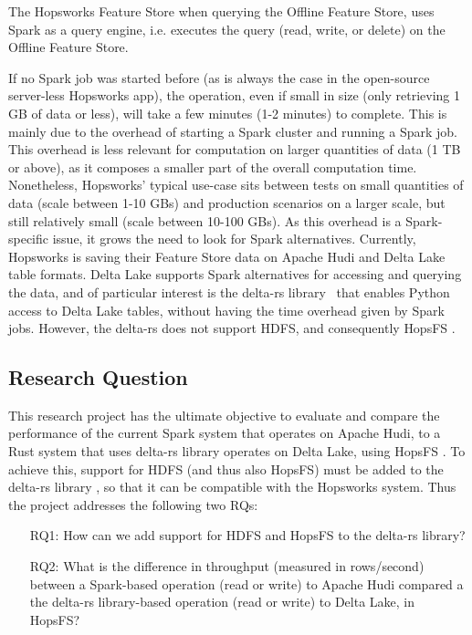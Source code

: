 The Hopsworks Feature Store \cite{HopsworksBatchRealtime2024} when querying the Offline Feature Store, uses Spark as a query engine, i.e. executes the query (read, write, or delete) on the Offline Feature Store.

If no Spark job was started before (as is always the case in the open-source server-less Hopsworks app), the operation, even if small in size (only retrieving 1 GB of data or less), will take a few minutes (1-2 minutes) to complete. This is mainly due to the overhead of starting a Spark cluster and running a Spark job.
This overhead is less relevant for computation on larger quantities of data (1 TB or above), as it composes a smaller part of the overall computation time.
Nonetheless, Hopsworks' typical use-case sits between tests on small quantities of data (scale between 1-10 GBs) and production scenarios on a larger scale, but still relatively small (scale between 10-100 GBs).
As this overhead is a Spark-specific issue, it grows the need to look for Spark alternatives. Currently, Hopsworks is saving their Feature Store data on Apache Hudi and Delta Lake table formats. Delta Lake supports Spark alternatives for accessing and querying the data, and of particular interest is the delta-rs library~\cite{DeltaioDeltars2024} that enables Python access to Delta Lake tables, without having the time overhead given by Spark jobs. 
However, the delta-rs \cite{DeltaioDeltars2024} does not support \gls{HDFS}, and consequently \gls{HopsFS} \cite{niaziHopsFSScalingHierarchical2017}.

\subsection{Research Question}
\label{sec:researchQuestion}
This research project has the ultimate objective to evaluate and compare the performance of the current Spark system that operates on Apache Hudi, to a Rust system that uses delta-rs library \cite{DeltaioDeltars2024} operates on Delta Lake, using \gls{HopsFS} \cite{niaziHopsFSScalingHierarchical2017}. To achieve this, support for \gls{HDFS} (and thus also \gls{HopsFS}) must be added to the delta-rs library \cite{DeltaioDeltars2024}, so that it can be compatible with the Hopsworks system. Thus the project addresses the following two \glspl{RQ}:
\begin{enumerate}
    \item[RQ1:] How can we add support for \gls{HDFS} and \gls{HopsFS} to the delta-rs library?
    \item[RQ2:] What is the difference in throughput (measured in rows/second) between a Spark-based operation (read or write) to Apache Hudi compared a the delta-rs library-based operation (read or write) to Delta Lake, in \gls{HopsFS}?  
\end{enumerate}

